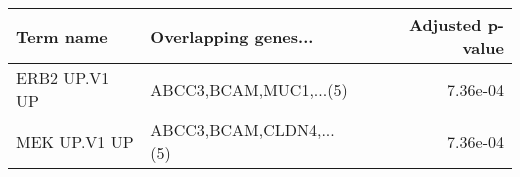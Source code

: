 \begin{tabular}{llr}
\toprule
    Term name &    Overlapping genes... &  Adjusted p-value \\
\midrule
ERB2 UP.V1 UP &  ABCC3,BCAM,MUC1,...(5) &          7.36e-04 \\
 MEK UP.V1 UP & ABCC3,BCAM,CLDN4,...(5) &          7.36e-04 \\
\bottomrule
\end{tabular}
